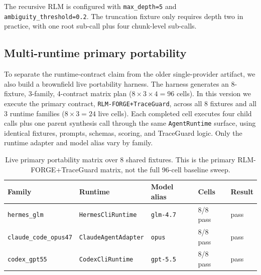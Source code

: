 \documentclass[11pt,a4paper]{article}
\begin{document}
The recursive RLM is configured with \texttt{max\_depth=5} and
\texttt{ambiguity\_threshold=0.2}. The truncation fixture only requires
depth two in practice, with one root sub-call plus four chunk-level sub-calls.

\subsection{Multi-runtime primary portability}

To separate the runtime-contract claim from the older single-provider
artifact, we also build a brownfield live portability harness. The harness
generates an 8-fixture, 3-family, 4-contract matrix plan
(\(8 \times 3 \times 4 = 96\) cells). In this version we execute the
primary contract, \texttt{RLM-FORGE+TraceGuard}, across all 8 fixtures and
all 3 runtime families (\(8 \times 3 = 24\) live cells). Each completed cell
executes four child calls plus one parent synthesis call through the same
\texttt{AgentRuntime} surface, using identical fixtures, prompts, schemas,
scoring, and TraceGuard logic. Only the runtime adapter and model alias vary
by family.

\begin{table}[t]
\centering
\caption{Live primary portability matrix over 8 shared fixtures. This is the
primary RLM-FORGE+TraceGuard matrix, not the full 96-cell baseline sweep.}
\label{tab:portability-primary}
\small
\begin{tabular}{lllll}
\toprule
Family & Runtime & Model alias & Cells & Result \\
\midrule
\texttt{hermes\_glm} & \texttt{HermesCliRuntime} & \texttt{glm-4.7} & 8/8 pass & pass \\
\texttt{claude\_code\_opus47} & \texttt{ClaudeAgentAdapter} & \texttt{opus} & 8/8 pass & pass \\
\texttt{codex\_gpt55} & \texttt{CodexCliRuntime} & \texttt{gpt-5.5} & 8/8 pass & pass \\
\bottomrule
\end{tabular}
\end{table}
\end{document}
